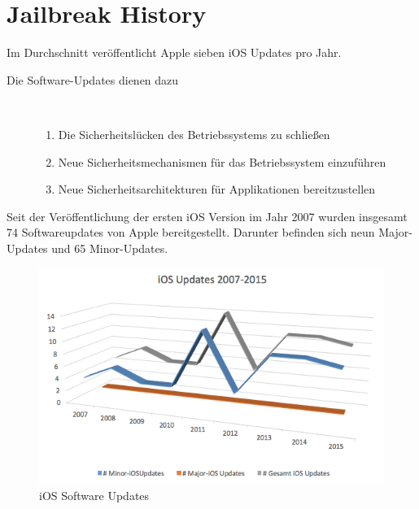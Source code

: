 
\section{Jailbreak History}
\label{sec:JBHistory}

Im Durchschnitt veröffentlicht Apple sieben iOS Updates pro Jahr. 
\begin{description}
\item[Die Software-Updates dienen dazu]~\par
	\begin{enumerate}
	    \item Die Sicherheitslücken des Betriebssystems zu schließen
	    \item Neue Sicherheitsmechanismen für das Betriebssystem einzuführen
	    \item Neue Sicherheitsarchitekturen für Applikationen bereitzustellen
	\end{enumerate}
\end{description} 
 
Seit der Veröffentlichung der ersten iOS Version im Jahr 2007 wurden insgesamt 74 Softwareupdates von Apple bereitgestellt. Darunter befinden sich neun Major-Updates und 65 Minor-Updates. 

\begin{figure}[!ht]
        \centering
                \includegraphics[scale=0.7]{Bilder/iOSUpdates}
        \caption{iOS Software Updates\cite{Apple[7]}}
        	\label{fig:iOS Software Updates}
\end{figure}

